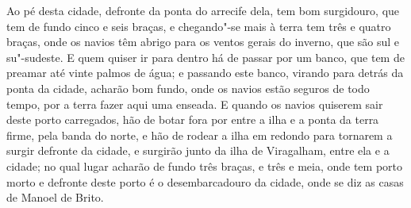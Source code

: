 \begin{linenumbers}
Ao pé desta cidade, defronte da ponta do arrecife dela, tem bom surgidouro, que tem de
fundo cinco e seis braças, e chegando"-se mais à terra tem três e quatro braças, onde os
navios têm abrigo para os ventos gerais do inverno, que são sul e su"-sudeste. E quem
quiser ir para dentro há de passar por um banco, que tem de preamar até vinte palmos de
água; e passando este banco, virando para detrás da ponta da cidade, acharão bom fundo,
onde os navios estão seguros de todo tempo, por a terra fazer aqui uma enseada. E quando
os navios quiserem sair deste porto carregados, hão de botar fora por entre a ilha e a
ponta da terra firme, pela banda do norte, e hão de rodear a ilha em redondo para tornarem
a surgir defronte da cidade, e surgirão junto da ilha de Viragalham, entre ela e a cidade;
no qual lugar acharão de fundo três braças, e três e meia, onde tem porto morto e defronte
deste porto é o desembarcadouro da cidade, onde se diz as casas de Manoel de Brito.


\end{linenumbers}
